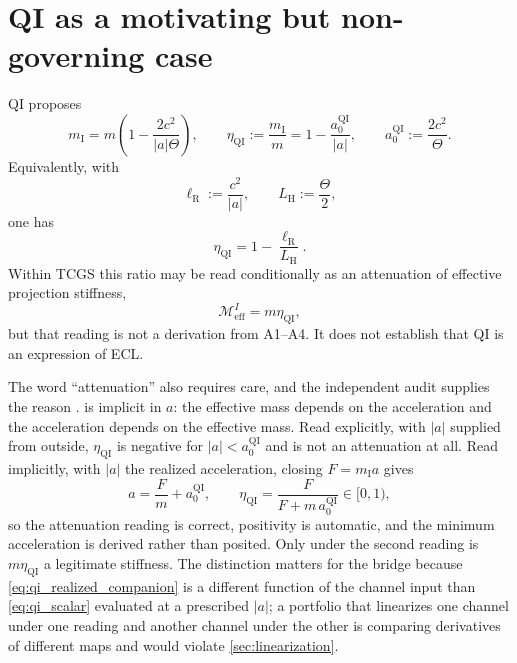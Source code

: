 \documentclass[11pt]{article}
\newcommand{\QI}{\mathrm{QI}}
\newcommand{\ellR}{\ell_{\mathrm R}}
\newcommand{\LH}{L_{\mathrm H}}
\newcommand{\Mcal}{\mathcal{M}}
\begin{document}
\section{QI as a motivating but non-governing case}

QI proposes
\begin{equation}
m_{\mathrm I}=m\left(1-\frac{2c^{2}}{|a|\Theta}\right),
\qquad
\eta_{\QI}:=\frac{m_{\mathrm I}}{m}
=1-\frac{a_{0}^{\QI}}{|a|},
\qquad
a_{0}^{\QI}:=\frac{2c^{2}}{\Theta}.
\label{eq:qi_scalar}
\end{equation}
Equivalently, with
\begin{equation}
\ellR:=\frac{c^{2}}{|a|},
\qquad
\LH:=\frac{\Theta}{2},
\end{equation}
one has
\begin{equation}
\eta_{\QI}=1-\frac{\ellR}{\LH}.
\label{eq:qi_ratio}
\end{equation}
Within TCGS this ratio may be read conditionally as an attenuation of effective projection stiffness,
\begin{equation}
\Mcal^{I}_{\mathrm{eff}}=m\eta_{\QI},
\end{equation}
but that reading is not a derivation from A1--A4. It does not establish that QI is an expression of ECL.

The word ``attenuation'' also requires care, and the independent audit supplies the reason \cite{ArellanoQIAudit2026}.  is implicit in \(a\): the effective mass depends on the acceleration and the acceleration depends on the effective mass. Read explicitly, with \(|a|\) supplied from outside, \(\eta_{\QI}\) is negative for \(|a|<a_{0}^{\QI}\) and is not an attenuation at all. Read implicitly, with \(|a|\) the realized acceleration, closing \(F=m_{\mathrm I}a\) gives
\begin{equation}
a=\frac{F}{m}+a_{0}^{\QI},
\qquad
\eta_{\QI}=\frac{F}{F+m\,a_{0}^{\QI}}\in[0,1),
\label{eq:qi_realized_companion}
\end{equation}
so the attenuation reading is correct, positivity is automatic, and the minimum acceleration is derived rather than posited. Only under the second reading is \(m\eta_{\QI}\) a legitimate stiffness. The distinction matters for the bridge because \cref{eq:qi_realized_companion} is a different function of the channel input than \cref{eq:qi_scalar} evaluated at a prescribed \(|a|\); a portfolio that linearizes one channel under one reading and another channel under the other is comparing derivatives of different maps and would violate \cref{sec:linearization}.
\end{document}
